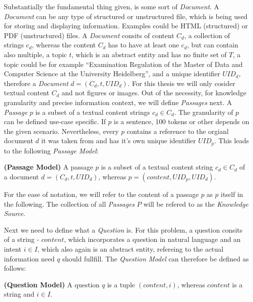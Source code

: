 Substantially the fundamental thing given, is some sort of \textit{Document}. A \textit{Document} can be any type of structured or unstructured file, which is being used for storing and displaying information. Examples could be HTML (structured) or PDF (unstructured) files. A \textit{Document} consits of content $C_d$, a collection of strings $c_d$, whereas the content $C_d$ has to have at least one $c_d$, but can contain also multiple, a topic $t$, which is an abstract entity and has no finite set of $T$, a topic could be for example \enquote{Examination Regulation of the Master of Data and Computer Science at the University Heidelberg}, and a unique identifier $UID_d$, therefore a \textit{Document} $d = (C_d,t, UID_d)$. For this thesis we will only cosider textual content $C_d$ and not figures or images. Out of the necessity, for knowledge granularity and precise information context, we will define \textit{Passages} next. A \textit{Passage} $p$ is a subset of a textual content strings $c_d \in C_d$. The granularity of $p$ can be defined use-case specific. If $p$ is a sentence, 100 tokens or other depends on the given scenario. Nevertheless, every $p$ contains a reference to the orgianl document $d$ it was taken from and has it's own unique identifier $UID_p$. This leads to the following \textit{Passage Model}:
\begin{definition}
    \textbf{(Passage Model)} A passage $p$ is a subset of a textual content string $c_d \in C_d$ of a document $d = (C_d,t, UID_d)$, whereas $p = (content, UID_p, UID_d)$.
    \label{def:passage_model}
\end{definition}

For the ease of notation, we will refer to the content of a passage $p$ as $p$ itself in the following. The collection of all \textit{Passages} $P$ will be refered to as the \textit{Knowledge Source}. 

Next we need to define what a \textit{Question} is. For this problem, a question consits of a string - $content$, which incorporates a question in natural language and an intent $i \in I$, which also again is an abstract entity, refereing to the actual information need $q$ should fullfill. The \textit{Question Model} can therefore be defined as follows:

\begin{definition}
    \textbf{(Question Model)} A question $q$ is a tuple $(content, i)$, whereas $content$ is a string and $i \in I$.
    \label{def:question_model}
\end{definition}

